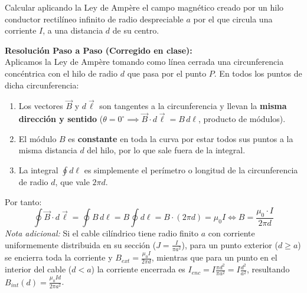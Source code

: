 \begin{ejercicio}
Calcular aplicando la Ley de Ampère el campo magnético creado por un hilo conductor rectilíneo infinito de radio despreciable $a$ por el que circula una corriente $I$, a una distancia $d$ de su centro.
\tcbline
\begin{center}
\end{center}
\textbf{Resolución Paso a Paso (Corregido en clase):}\\[4pt]
Aplicamos la Ley de Ampère tomando como línea cerrada una circunferencia concéntrica con el hilo de radio $d$ que pasa por el punto $P$. En todos los puntos de dicha circunferencia:
\begin{enumerate}[leftmargin=*]
    \item Los vectores $\vec{B}$ y $d\vec{\ell}$ son tangentes a la circunferencia y llevan la \textbf{misma dirección y sentido} ($\theta = 0^\circ \implies \vec{B}\cdot d\vec{\ell} = B\, d\ell$, producto de módulos).
    \item El módulo $B$ es \textbf{constante} en toda la curva por estar todos sus puntos a la misma distancia $d$ del hilo, por lo que sale fuera de la integral.
    \item La integral $\oint d\ell$ es simplemente el perímetro o longitud de la circunferencia de radio $d$, que vale $2\pi d$.
\end{enumerate}
Por tanto:
\begin{equation}
    \oint \vec{B} \cdot d\vec{\ell} = \oint B\, d\ell = B \oint d\ell = B \cdot (2\pi d) = \mu_0 I \iff \boxed{B = \frac{\mu_0 \cdot I}{2\pi d}}
\end{equation}
\footnotesize\textit{Nota adicional:} Si el cable cilíndrico tiene radio finito $a$ con corriente uniformemente distribuida en su sección ($J = \frac{I}{\pi a^2}$), para un punto exterior ($d \ge a$) se encierra toda la corriente y $B_{ext} = \frac{\mu_0 I}{2\pi d}$, mientras que para un punto en el interior del cable ($d < a$) la corriente encerrada es $I_{enc} = I \frac{\pi d^2}{\pi a^2} = I\frac{d^2}{a^2}$, resultando $B_{int}(d) = \frac{\mu_0 I d}{2\pi a^2}$.
\end{ejercicio}

